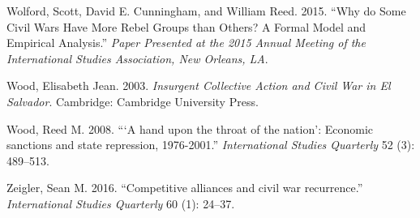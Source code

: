 \documentclass[12pt,]{book}
\theoremstyle{definition}
\theoremstyle{definition}
\theoremstyle{remark}
\begin{document}
\hypertarget{ref-Wolford}{}
Wolford, Scott, David E. Cunningham, and William Reed. 2015. ``Why do
Some Civil Wars Have More Rebel Groups than Others? A Formal Model and
Empirical Analysis.'' \emph{Paper Presented at the 2015 Annual Meeting
of the International Studies Association, New Orleans, LA}.

\hypertarget{ref-Wood2003}{}
Wood, Elisabeth Jean. 2003. \emph{Insurgent Collective Action and Civil
War in El Salvador}. Cambridge: Cambridge University Press.

\hypertarget{ref-Wood2008a}{}
Wood, Reed M. 2008. ```A hand upon the throat of the nation': Economic
sanctions and state repression, 1976-2001.'' \emph{International Studies
Quarterly} 52 (3): 489--513.

\hypertarget{ref-Zeigler2016}{}
Zeigler, Sean M. 2016. ``Competitive alliances and civil war
recurrence.'' \emph{International Studies Quarterly} 60 (1): 24--37.
\end{document}
